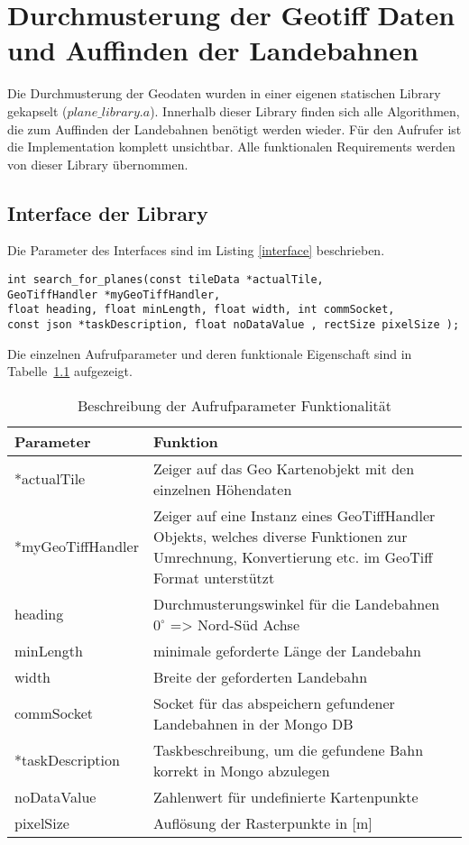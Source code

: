 \documentclass[10pt,a4paper]{report}
\begin{document}
\chapter{Durchmusterung der Geotiff Daten und Auffinden der Landebahnen}
Die Durchmusterung der Geodaten wurden in einer eigenen statischen Library gekapselt ($plane\_library.a$). Innerhalb dieser Library finden sich alle Algorithmen, die zum Auffinden der Landebahnen benötigt werden wieder. Für den Aufrufer ist die Implementation komplett unsichtbar. Alle funktionalen Requirements werden von dieser Library übernommen.


\section{Interface der Library}

Die Parameter des Interfaces sind im Listing \ref{interface} beschrieben.

\begin{lstlisting}[caption=Interface Beschreibung, label=interface]
int search_for_planes(const tileData *actualTile, 
GeoTiffHandler *myGeoTiffHandler, 
float heading, float minLength, float width, int commSocket,
const json *taskDescription, float noDataValue , rectSize pixelSize );
\end{lstlisting}

Die einzelnen Aufrufparameter und deren funktionale Eigenschaft sind in Tabelle~\ref{beschreibungparameter} aufgezeigt.

\begin{table}[htb]
\centering
\begin{tabular}{|p{4.5cm}|p{10cm}|}
\hline 
Parameter & Funktion \\ 
\hline 
*actualTile & Zeiger auf das Geo Kartenobjekt mit den einzelnen Höhendaten \\ 
\hline 
*myGeoTiffHandler & Zeiger auf eine Instanz eines GeoTiffHandler Objekts, 
welches diverse Funktionen zur Umrechnung, Konvertierung etc. im GeoTiff Format unterstützt \\ 
\hline 
heading & Durchmusterungswinkel für die Landebahnen $0^\circ$ => Nord-Süd Achse \\ 
\hline 
minLength & minimale geforderte Länge der Landebahn \\ 
\hline 
width & Breite der geforderten Landebahn \\ 
\hline 
commSocket & Socket für das abspeichern gefundener Landebahnen in der Mongo DB\\ 
\hline 
*taskDescription & Taskbeschreibung, um die gefundene Bahn korrekt in Mongo abzulegen \\ 
\hline 
noDataValue & Zahlenwert für undefinierte Kartenpunkte \\ 
\hline 
pixelSize & Auflösung der Rasterpunkte in [m]\\
\hline 

\end{tabular} 
\caption{Beschreibung der Aufrufparameter Funktionalität}\label{beschreibungparameter}
\end{table}
\end{document}
